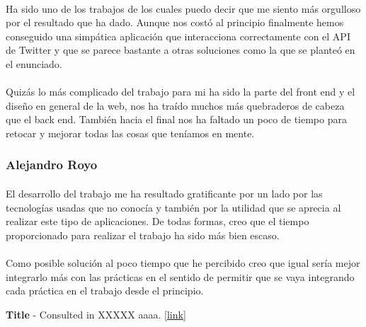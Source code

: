 \documentclass[a4paper]{article}
\begin{document}
			\paragraph{} Ha sido uno de los trabajos de los cuales puedo decir que me siento más orgulloso por el resultado que ha dado. Aunque nos costó al principio finalmente hemos conseguido una simpática aplicación que interacciona correctamente con el API de Twitter y que se parece bastante a otras soluciones como la que se planteó en el enunciado.
			
			\paragraph{}Quizás lo más complicado del trabajo para mi ha sido la parte del front end y el diseño en general de la web, nos ha traído muchos más quebraderos de cabeza que el back end. También hacia el final nos ha faltado un poco de tiempo para retocar y mejorar todas las cosas que teníamos en mente.
		
		\subsubsection{Alejandro Royo}
		
			\paragraph{} El desarrollo del trabajo me ha resultado gratificante por un lado por las tecnologías usadas que no conocía y también por la utilidad que se aprecia al realizar este tipo de aplicaciones. De todas formas, creo que el tiempo proporcionado para realizar el trabajo ha sido más bien escaso.
			
			\paragraph{} Como posible solución al poco tiempo que he percibido creo que igual sería mejor integrarlo más con las prácticas en el sentido de permitir que se vaya integrando cada práctica en el trabajo desde el principio.
	
\newpage
\begin{thebibliography}{99} 
 \textbf{Title} - Consulted in XXXXX aaaa. [\url{link}]

\end{thebibliography}
\end{document}
